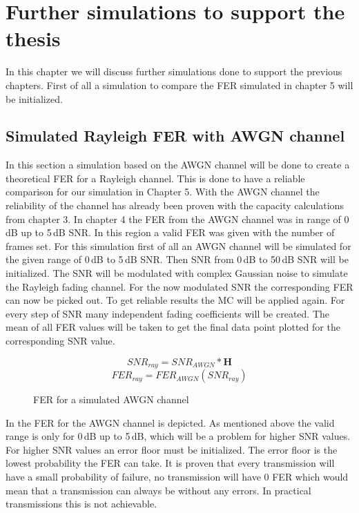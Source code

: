 \chapter{Further simulations to support the thesis} \label{chap:Experiments}
\graphicspath{{C:/Users/Kevin/Bachelarbeit/Bachelorarbeit/01_Bachelorarbeit_LaTex/02_Figures/}}

In this chapter we will discuss further simulations done to support the previous chapters. First of all a simulation to compare the \gls{FER} simulated in chapter 5 will be initialized.
\section{Simulated Rayleigh FER with AWGN channel}
\label{RAYAWGN}

In this section a simulation based on the AWGN channel will be done to create a theoretical \gls{FER} for a Rayleigh channel. This is done to have a reliable comparison for our simulation in Chapter 5. 
With the AWGN channel the reliability of the channel has already been proven with the capacity calculations from chapter 3. In chapter 4 the \gls{FER} from the AWGN channel was in range of 0\,dB up to 5\,dB SNR. In this region a valid \gls{FER} was given with the number of frames set. 
For this simulation first of all an AWGN channel will be simulated for the given range of 0\,dB to 5\,dB SNR. Then SNR from 0\,dB to 50\,dB SNR will be initialized. The SNR will be modulated with complex Gaussian noise to simulate the Rayleigh fading channel. For the now modulated SNR the corresponding \gls{FER} can now be picked out. To get reliable results the \gls{MC} will be applied again. For every step of SNR many independent fading coefficients will be created. The mean of all \gls{FER} values will be taken to get the final data point plotted for the corresponding \gls{SNR} value.    

\begin{equation}
SNR_{ray} = SNR_{AWGN} * \textbf{H}
\end{equation}
\begin{equation}
FER_{ray} = FER_{AWGN}(SNR_{ray})
\end{equation}

\begin{figure}[!htb]
	\setlength{}
	\setlength\fheight{0.4\textheight}
    \centering
    
    \caption{FER for a simulated AWGN channel}
    \label{fig:FERAWGN}
\end{figure}
In  the \gls{FER} for the AWGN channel is depicted. As mentioned above the valid range is only for 0\,dB up to 5\,dB, which will be a problem for higher \gls{SNR} values. For higher SNR values an error floor must be initialized. The error floor is the lowest probability the \gls{FER} can take. It is proven that every transmission will have a small probability of failure, no transmission will have 0 \gls{FER} which would mean that a transmission can always be without any errors. In practical transmissions this is not achievable.

